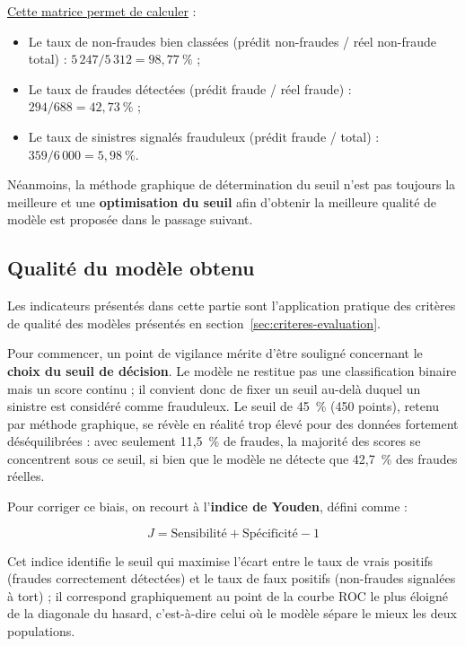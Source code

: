 \underline{Cette matrice permet de calculer} :

\begin{itemize}[label =$\bullet$]
    \item Le taux de non-fraudes bien classées (prédit non-fraudes / réel non-fraude total) : $5\,247 / 5\,312 = 98{,}77~\%$ ;
    \item Le taux de fraudes détectées (prédit fraude / réel fraude) : $294 / 688 = 42{,}73~\%$ ;
    \item Le taux de sinistres signalés frauduleux (prédit fraude / total) : $359 / 6\,000 = 5{,}98~\%$.
\end{itemize}

Néanmoins, la méthode graphique de détermination du seuil n'est pas toujours la meilleure et une \textbf{optimisation du seuil} afin d'obtenir la meilleure qualité de modèle est proposée dans le passage suivant.

\subsection{Qualité du modèle obtenu}
\label{sec:qualite-modele}

Les indicateurs présentés dans cette partie sont l'application pratique des critères de qualité des modèles présentés en section~\ref{sec:criteres-evaluation}.

Pour commencer, un point de vigilance mérite d'être souligné concernant le \textbf{choix du seuil de décision}. Le modèle ne restitue pas une classification binaire mais un score continu ; il convient donc de fixer un seuil au-delà duquel un sinistre est considéré comme frauduleux. Le seuil de 45~\% (450 points), retenu par méthode graphique, se révèle en réalité trop élevé pour des données fortement déséquilibrées : avec seulement 11,5~\% de fraudes, la majorité des scores se concentrent sous ce seuil, si bien que le modèle ne détecte que 42,7~\% des fraudes réelles.

Pour corriger ce biais, on recourt à l'\textbf{indice de Youden}, défini comme :

\begin{equation}
    J = \text{Sensibilité} + \text{Spécificité} - 1
\end{equation}

Cet indice identifie le seuil qui maximise l'écart entre le taux de vrais positifs (fraudes correctement détectées) et le taux de faux positifs (non-fraudes signalées à tort) ; il correspond graphiquement au point de la courbe ROC le plus éloigné de la diagonale du hasard, c'est-à-dire celui où le modèle sépare le mieux les deux populations.


